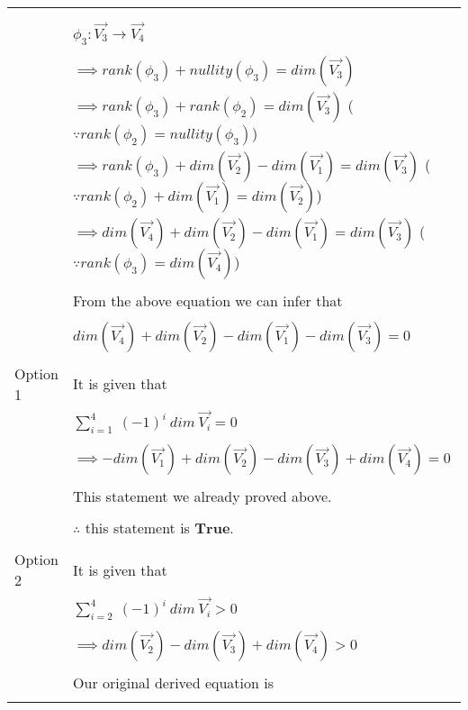 \begin{longtable}{|l|l|}
		& \\
		& \\
		& $\phi_3 : \vec{V_3} \rightarrow \vec{V_4}$ \\
		& \\
		& $\implies rank(\phi_3) + nullity(\phi_3) = dim(\vec{V_3})$ \\
		& $\implies rank(\phi_3) + rank(\phi_2) = dim(\vec{V_3})$ \qquad \qquad ($\because  rank(\phi_2) = nullity(\phi_3)$) \\
		& $\implies rank(\phi_3) + dim(\vec{V_2}) - dim(\vec{V_1}) = dim(\vec{V_3})$     ($\because  rank(\phi_2) + dim(\vec{V_1}) = dim(\vec{V_2})$) \\
		& $\implies dim(\vec{V_4}) + dim(\vec{V_2}) - dim(\vec{V_1}) = dim(\vec{V_3})$ \qquad ($\because  rank(\phi_3) = dim(\vec{V_4})$) \\
		& \\
		& From the above equation we can infer that \\
		& \\
		& \qquad \qquad $dim(\vec{V_4}) + dim(\vec{V_2}) - dim(\vec{V_1}) - dim(\vec{V_3}) = 0$ \\
		& \\
		\hline
		\multirow{3}{*}{Option 1  } & \\
		& It is given that \\
		& \\
		& $\sum_{i=1}^{4} \ (-1)^{i} \ dim \ \vec{V_i} = 0$ \\
		& \\
		& $\implies - dim(\vec{V_1}) + dim(\vec{V_2}) - dim(\vec{V_3}) + dim(\vec{V_4}) = 0$ \\
		& \\
		& This statement we already proved above. \\
		& \\
		& $\therefore$ this statement is $\mathbf{True}$. \\
		&\\
		\hline
		\multirow{3}{*}{Option 2} & \\
		& It is given that \\
		& \\
		& $\sum_{i=2}^{4} \ (-1)^{i} \ dim \ \vec{V_i} > 0$ \\
		& \\
		& $\implies dim(\vec{V_2}) - dim(\vec{V_3}) + dim(\vec{V_4}) > 0$ \\
		& \\
		& Our original derived equation is \\
		& \\

\end{longtable}
